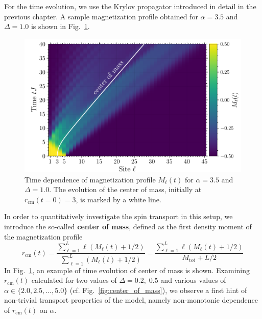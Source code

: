 For the time evolution, we use the Krylov propagator introduced in detail in the previous chapter.
A sample magnetization profile obtained for \(\alpha = 3.5\) and \(\Delta = 1.0\) is shown in 
Fig.~\ref{fig:magnetization_profile}.
\begin{figure}[htbp]
  \centering
  \includegraphics[width=0.8\linewidth]{Figures/magnetization.pdf}
  \caption{Time dependence of magnetization profile \(M_{\ell}(t)\) for \(\alpha = 3.5\) and \(\Delta = 1.0\).
  The evolution of the center of mass, initially at \(r_{\text{cm}}(t=0)=3\), is marked by a white line.}
  \label{fig:magnetization_profile}
\end{figure}
In order to quantitatively investigate the spin transport in this setup, we introduce the so-called
\textbf{center of mass}, defined as the first density moment of the magnetization profile  
\begin{equation}
  r_{\text{cm}}(t) = \frac{\sum_{\ell=1}^{L} \ell \left(M_{\ell}(t)+1/2\right)}
  {\sum_{\ell=1}^{L} \left(M_{\ell}(t) + 1/2\right)} = 
\frac{\sum_{\ell=1}^{L} \ell \left(M_{\ell}(t)+1/2\right)}
  {M_{\mathrm{tot}} + L/2}
  \label{eq:center_of_mass} 
\end{equation}
In Fig.~\ref{fig:magnetization_profile}, an example of time evolution of center of mass is shown. Examining \(r_{\text{cm}}(t)\)
calculated for two values of \(\Delta = 0.2,\;0.5\) and various values of \(\alpha \in \{2.0,2.5,\ldots,5.0\}\)
(cf. Fig.~\ref{fig:center_of_mass}), we observe a first hint of non-trivial transport properties of the model, namely
non-monotonic dependence of \(r_{\text{cm}}(t)\) on \(\alpha\). 


